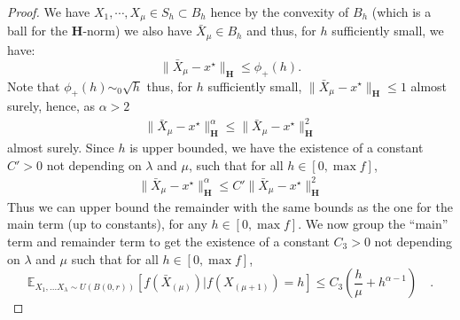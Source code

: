\begin{proof}
We have $X_{1},\cdots,X_{\mu}\in S_{h}\subset B_{h}$
hence by the convexity of $B_h$ (which is a ball for the $\mathbf{H}$-norm) we also have $\bar{X}_{\mu}\in B_{h}$ and
thus, for $h$ sufficiently small, we have:
\[
\lVert\bar{X}_{\mu}-x^\star\rVert_{\mathbf{H}}\le \phi_+(h).
\]
Note that $\phi_+(h)\sim_{0} \sqrt{h} $ thus, for $h$ sufficiently small, $ \lVert\bar{X}_{\mu}-x^\star\rVert_{\mathbf{H}}\le 1$
almost surely, hence, as $\alpha > 2$
\begin{align*}
\lVert\bar{X}_{\mu}-x^\star\rVert^{\alpha}_{\mathbf{H}}\leq \lVert\bar{X}_{\mu}-x^\star\rVert^{2}_{\mathbf{H}}
\end{align*}
almost surely. Since $h$ is upper bounded, we have the existence of a constant $C'>0$ not depending on $\lambda$ and $\mu$, such that for all $h\in [0,\max f]$,
\begin{align*}
\lVert\bar{X}_{\mu}-x^\star\rVert^{\alpha}_{\mathbf{H}}\leq C'\lVert\bar{X}_{\mu}-x^\star\rVert^{2}_{\mathbf{H}}
\end{align*}
Thus we can upper bound the remainder with the same bounds as the one for the main term (up to constants), for any $h\in[0,\max f]$.
We now group the ``main'' term and remainder term to get the existence of a constant $C_3>0$ not depending on $\lambda$ and $\mu$ such that for all $h\in [0,\max f]$,
\[
\mathbb{E}_{X_{1},...X_{\lambda}\sim U(B(0,r))}\left[f(\bar{X}_{(\mu)})|f(X_{(\mu+1)})=h\right]\le C_3\left(\frac{h}{\mu}+h^{\alpha-1}\right)\quad.
\]


\end{proof}




